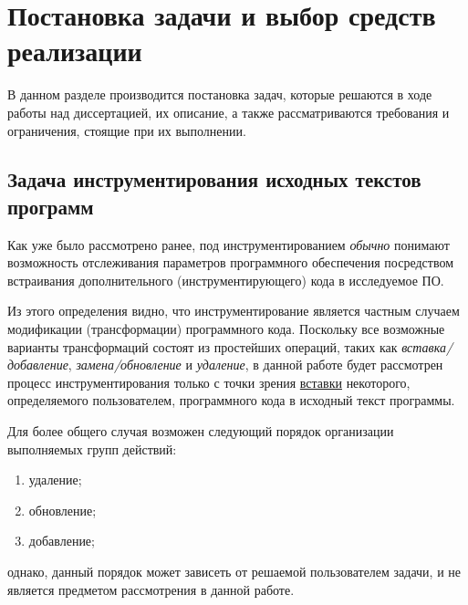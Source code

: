 \chapter{Постановка задачи и выбор средств реализации}

В данном разделе производится постановка задач, которые решаются в ходе работы над диссертацией, их описание, а также рассматриваются требования и ограничения, стоящие при их выполнении.

\section{Задача инструментирования исходных текстов программ}

Как уже было рассмотрено ранее, под инструментированием \textit{обычно} понимают возможность отслеживания параметров программного обеспечения посредством встраивания дополнительного (инструментирующего) кода в исследуемое ПО.

Из этого определения видно, что инструментирование является частным случаем модификации (трансформации) программного кода.
Поскольку все возможные варианты трансформаций состоят из простейших операций, таких как \textit{вставка/добавление}, \textit{замена/обновление} и \textit{удаление}, в данной работе будет рассмотрен процесс инструментирования только с точки зрения \underline{вставки} некоторого, определяемого пользователем, программного кода в исходный текст программы.

Для более общего случая возможен следующий порядок организации выполняемых групп действий:
\begin{enumerate}[noitemsep]
  \item удаление;
  \item обновление;
  \item добавление;
\end{enumerate}
однако, данный порядок может зависеть от решаемой пользователем задачи, и не является предметом рассмотрения в данной работе.

